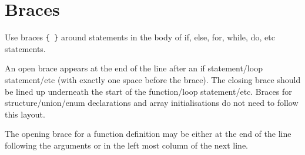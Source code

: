 \documentclass{article}
\begin{document}
\section{Braces}
Use braces \texttt{\{ \}} around statements in the body of if, else, for, while, do, etc statements.

An open brace appears at the end of the line after an if statement/loop statement/etc (with exactly 
one space before the brace).
The closing brace should be lined up underneath the start of the function/loop statement/etc.
Braces for structure/union/enum declarations and array initialisations do not need to follow this layout.

The opening brace for a function definition may be either at the end of the line following the 
arguments or in the left most column of the next line.
\end{document}
